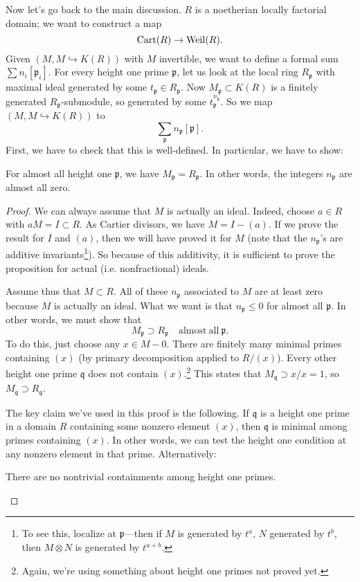 Now let's go back to the main discussion. $R$ is a noetherian locally factorial
domain; we want to construct a map
\[ \operatorname{Cart}(R) \to \operatorname{Weil}(R).  \]
Given $(M, M \hookrightarrow K(R))$ with $M$ invertible, we want to define a
formal sum $\sum n_i [\mathfrak{p}_i]$. For every height one prime
$\mathfrak{p}$, let us look at the local ring $R_{\mathfrak{p}}$ with maximal
ideal generated by some $t_{\mathfrak{p}} \in R_{\mathfrak{p}}$. Now
$M_{\mathfrak{p}} \subset K(R)$ is a finitely generated
$R_{\mathfrak{p}}$-submodule, so generated by some
$t_{\mathfrak{p}}^{n_{\mathfrak{p}}}$. So we map $(M, M \hookrightarrow K(R))$
to 
\[ \sum_{\mathfrak{p}} n_{\mathfrak{p}}[\mathfrak{p}]. \]
First, we have to check that this is well-defined. In particular, we have to
show:

\begin{proposition} 
For almost all height one $\mathfrak{p}$, we have $M_{\mathfrak{p}} =
R_{\mathfrak{p}}$. In other words, the integers $n_{\mathfrak{p}}$ are almost all zero.
\end{proposition} 
\begin{proof} 
We can always assume that $M$ is actually an ideal. Indeed, choose $a \in R$
with $aM = I \subset R$. As Cartier divisors, we have $M  = I  - (a)$. If we
prove the result for $I$ and $(a)$, then we will have proved it for $M$ (note
that the $n_{\mathfrak{p}}$'s are additive invariants\footnote{To see this,
localize at $\mathfrak{p}$---then if $M$ is generated by $t^a$, $N$ generated
by $t^b$, then $M \otimes N$ is generated by $t^{a+b}$.}). So because of this
additivity, it is sufficient to prove the proposition for actual (i.e.
nonfractional) ideals.

Assume thus that $M \subset R$.
All of these $n_{\mathfrak{p}}$ associated to $M$ are at least zero because $M$
is actually an ideal. What we want is that $n_{\mathfrak{p}} \leq 0$ for almost
all $\mathfrak{p}$. In other words, we must show that
\[ M_{\mathfrak{p}} \supset R_{\mathfrak{p}} \quad \mathrm{almost \ all \ }
\mathfrak{p}.  \]
To do this, just choose any $x \in M - 0$. There are finitely many minimal
primes containing $(x)$ (by primary decomposition applied to $R/(x)$). Every
other height one prime $\mathfrak{q}$ does not contain $(x)$.\footnote{Again, we're using
something about height one primes not proved yet.}
This states that $M_{\mathfrak{q}} \supset x/x = 1$, so $M_{\mathfrak{q}}
\supset R_{\mathfrak{q}}$.

The key claim we've used in this proof is the following. If $\mathfrak{q}$ is a 
height one prime in a domain $R$ containing some nonzero element $(x)$, then
$\mathfrak{q}$ is minimal among primes containing $(x)$. In other words, we can
test the height one condition at any nonzero element in that prime.
Alternatively:
\begin{lemma} 
There are no nontrivial containments among height one primes.
\end{lemma} 
\end{proof} 

